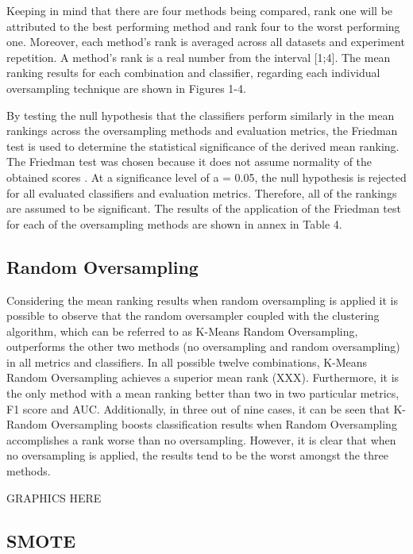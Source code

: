\documentclass[parskip=full]{scrartcl}
\begin{document}
Keeping in mind that there are four methods being compared, rank one will be
attributed to the best performing method and rank four to the worst performing
one. Moreover, each method's rank is averaged across all datasets and experiment
repetition. A method's rank is a real number from the interval [1;4]. The mean
ranking results for each combination and classifier, regarding each individual
oversampling technique are shown in Figures 1-4.

By testing the null hypothesis that the classifiers perform similarly in the
mean rankings across the oversampling methods and evaluation metrics, the
Friedman test \cite{Friedman1937} is used to determine the statistical
significance of the derived mean ranking. The Friedman test was chosen because
it does not assume normality of the obtained scores \cite{Demsar2006}. At a
significance level of a = 0.05, the null hypothesis is rejected for all
evaluated classifiers and evaluation metrics. Therefore, all of the rankings are
assumed to be significant. The results of the application of the Friedman test
for each of the oversampling methods are shown in annex in Table 4.

\subsection{Random Oversampling}

Considering the mean ranking results when random oversampling is applied it is
possible to observe that the random oversampler coupled with the clustering
algorithm, which can be referred to as K-Means Random Oversampling, outperforms
the other two methods (no oversampling and random oversampling) in all metrics
and classifiers. In all possible twelve combinations, K-Means Random
Oversampling achieves a superior mean rank (XXX). Furthermore, it is the only
method with a mean ranking better than two in two particular metrics, F1 score
and AUC. Additionally, in three out of nine cases, it can be seen that K-Random
Oversampling boosts classification results when Random Oversampling accomplishes
a rank worse than no oversampling. However, it is clear that when no
oversampling is applied, the results tend to be the worst amongst the three
methods.

GRAPHICS HERE

\subsection{SMOTE}
\end{document}

